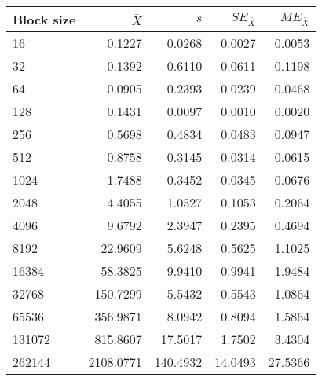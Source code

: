 \begin{tabular}{lrrrr}\toprule
{\small Block size} & $\bar{X}$ & $s$ & $SE_{\bar{X}}$ & $ME_{\bar{X}}$ \\\midrule
16 & 0.1227 & 0.0268 & 0.0027 & 0.0053\\
32 & 0.1392 & 0.6110 & 0.0611 & 0.1198\\
64 & 0.0905 & 0.2393 & 0.0239 & 0.0468\\
128 & 0.1431 & 0.0097 & 0.0010 & 0.0020\\
256 & 0.5698 & 0.4834 & 0.0483 & 0.0947\\
512 & 0.8758 & 0.3145 & 0.0314 & 0.0615\\
1024 & 1.7488 & 0.3452 & 0.0345 & 0.0676\\
2048 & 4.4055 & 1.0527 & 0.1053 & 0.2064\\
4096 & 9.6792 & 2.3947 & 0.2395 & 0.4694\\
8192 & 22.9609 & 5.6248 & 0.5625 & 1.1025\\
16384 & 58.3825 & 9.9410 & 0.9941 & 1.9484\\
32768 & 150.7299 & 5.5432 & 0.5543 & 1.0864\\
65536 & 356.9871 & 8.0942 & 0.8094 & 1.5864\\
131072 & 815.8607 & 17.5017 & 1.7502 & 3.4304\\
262144 & 2108.0771 & 140.4932 & 14.0493 & 27.5366\\
\bottomrule
\end{tabular}
